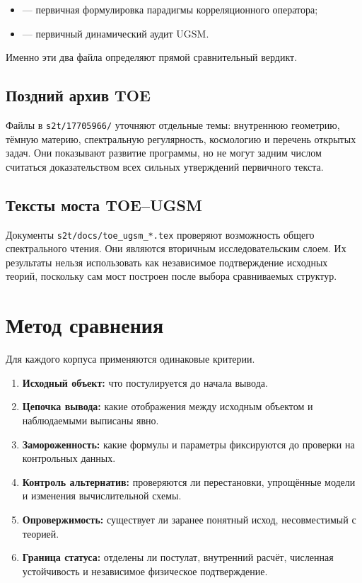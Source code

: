 \documentclass[12pt,a4paper]{article}
\begin{document}
\begin{itemize}
    \item {} --- первичная формулировка парадигмы
    корреляционного оператора;
    \item {} --- первичный
    динамический аудит UGSM.
\end{itemize}

Именно эти два файла определяют прямой сравнительный вердикт.

\subsection{Поздний архив TOE}

Файлы в \texttt{s2t/17705966/} уточняют отдельные темы: внутреннюю геометрию,
тёмную материю, спектральную регулярность, космологию и перечень открытых
задач. Они показывают развитие программы, но не могут задним числом считаться
доказательством всех сильных утверждений первичного текста.

\subsection{Тексты моста TOE--UGSM}

Документы \texttt{s2t/docs/toe\_ugsm\_*.tex} проверяют возможность общего
спектрального чтения. Они являются вторичным исследовательским слоем. Их
результаты нельзя использовать как независимое подтверждение исходных теорий,
поскольку сам мост построен после выбора сравниваемых структур.

\section{Метод сравнения}

Для каждого корпуса применяются одинаковые критерии.

\begin{enumerate}
    \item \textbf{Исходный объект:} что постулируется до начала вывода.
    \item \textbf{Цепочка вывода:} какие отображения между исходным объектом и
    наблюдаемыми выписаны явно.
    \item \textbf{Замороженность:} какие формулы и параметры фиксируются до
    проверки на контрольных данных.
    \item \textbf{Контроль альтернатив:} проверяются ли перестановки,
    упрощённые модели и изменения вычислительной схемы.
    \item \textbf{Опровержимость:} существует ли заранее понятный исход,
    несовместимый с теорией.
    \item \textbf{Граница статуса:} отделены ли постулат, внутренний расчёт,
    численная устойчивость и независимое физическое подтверждение.
\end{enumerate}
\end{document}
